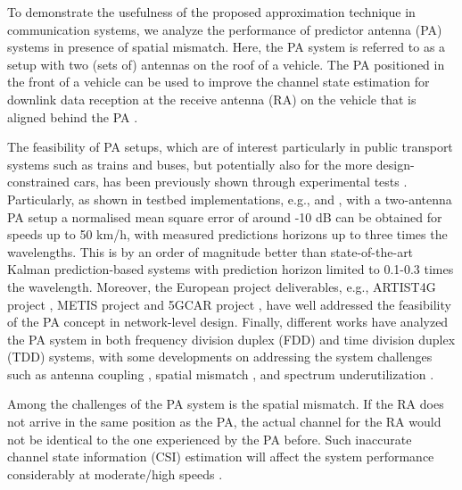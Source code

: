 To demonstrate the usefulness of the proposed approximation technique in communication systems, we analyze the performance of predictor antenna (PA) systems in presence of spatial mismatch. Here, the PA system is referred to as a setup with two (sets of) antennas on the roof of a vehicle. The PA positioned in the front of a vehicle can be used to improve the channel state estimation for downlink data reception at the receive antenna (RA) on the vehicle that is aligned behind the PA \cite{Sternad2012WCNCWusing,DT2015ITSMmaking,BJ2017PIMRCpredictor,phan2018WSAadaptive,Jamaly2014EuCAPanalysis, BJ2017ICCWusing,Apelfrojd2018PIMRCkalman,Jamaly2019IETeffects,Guo2019WCLrate}. 


The feasibility of PA setups, which are of interest particularly in public transport systems such as trains and buses, but potentially also for the more design-constrained cars, has been previously shown through experimental tests \cite{Sternad2012WCNCWusing,DT2015ITSMmaking,BJ2017PIMRCpredictor,phan2018WSAadaptive,Jamaly2014EuCAPanalysis, BJ2017ICCWusing,Apelfrojd2018PIMRCkalman}. Particularly, as shown in testbed implementations, e.g.,  \cite{BJ2017PIMRCpredictor} and \cite{BJ2017ICCWusing}, with a two-antenna PA setup a normalised mean square error  of around -10 dB can be obtained for speeds up to 50 km/h, with  measured predictions horizons up to three times the wavelengths. This is by an order of magnitude better than state-of-the-art Kalman prediction-based systems \cite{Ekman2002,Aronsson2011} with prediction horizon limited to 0.1-0.3 times the wavelength. Moreover, the  European project deliverables, e.g., ARTIST4G project \cite[Chapter 2]{ARTIST4G}, METIS project \cite[P. 107]{metis2015d33} and 5GCAR project \cite[Chapter 3]{5gcar2019d33}, have  well addressed the feasibility of the PA concept in network-level design. Finally, different works have analyzed the PA system in both frequency division duplex (FDD) \cite{BJ2017ICCWusing,BJ2017PIMRCpredictor,phan2018WSAadaptive} and time division duplex (TDD) \cite{DT2015ITSMmaking,Apelfrojd2018PIMRCkalman} systems, with some developments on addressing the system challenges such as  antenna coupling \cite{Jamaly2014EuCAPanalysis,Jamaly2019IETeffects}, spatial mismatch \cite{Jamaly2019IETeffects,Guo2019WCLrate}, and spectrum underutilization \cite{guo2020power,guo2020rate}. 

Among the challenges of the PA system is the spatial mismatch. If the RA does not arrive in the same position as the PA, the actual channel for the RA would not be identical to the one experienced by the PA before. Such inaccurate channel state information (CSI) estimation will affect the system performance considerably at moderate/high speeds \cite{DT2015ITSMmaking,Guo2019WCLrate}. 

